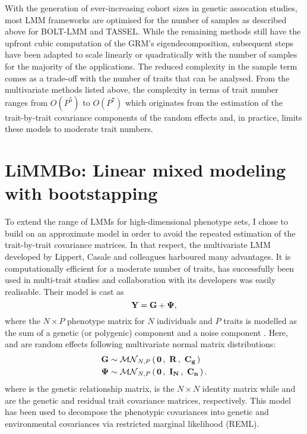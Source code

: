 With the generation of ever-increasing cohort sizes in genetic assocation studies, most LMM frameworks are optimised for the number of samples as described above for BOLT-LMM and TASSEL. While the remaining methods still have the upfront cubic computation of the GRM's eigendecomposition, subsequent steps have been adapted to scale linearly or quadratically with the number of samples for the majority of the applications. The reduced complexity in the sample term comes as a trade-off with the number of traits that can be analysed. From the multivariate methods listed above, the complexity in terms of trait number ranges from \(O(P^5)\) to \(O(P^7)\) which originates from the estimation of the trait-by-trait covariance components of the random effects and, in practice, limits these models to moderate trait numbers.

\section{LiMMBo: Linear mixed modeling with bootstapping}
\label{section:intro-limmbo}
To extend the range of LMMs for high-dimensional phenotype sets, I chose to build on an approximate model in order to avoid the repeated estimation of the trait-by-trait covariance matrices. In that respect, the multivariate LMM developed by Lippert, Casale and colleagues \citep{Lippert2014,Casale2015} harboured many advantages. It is computationally efficient for a moderate number of traits, has successfully  been used in multi-trait studies \citep{Cannavo2016,Schor2017} and collaboration with its developers was easily realisable. 
Their model is cast as
\begin{equation}
\boldsymbol{\mathbf{Y}} = \boldsymbol{\mathbf{G}} + \boldsymbol{\mathbf{\Psi}},
\label{eq:vd}
\end{equation}
%
where the \(N \times P\) phenotype matrix  for \(N\) individuals and \(P\) traits is modelled as the sum of a genetic (or polygenic) component  and a noise component \tmat{\Psi}. Here,  and  are random effects following multivariate normal matrix distributions:
\begin{equation}
\begin{aligned}
\boldsymbol{\mathbf{G}} &\sim\mathcal{MN}_{N,P}\left(\, \boldsymbol{\mathbf{{\boldsymbol{\mathbf{0}}}}} \,,~\boldsymbol{\mathbf{{\boldsymbol{\mathbf{R}}}}}\,,~\boldsymbol{\mathbf{{\boldsymbol{\mathbf{C}}_{g}}}} \,\right)  \\
\boldsymbol{\mathbf{\Psi}} &\sim\mathcal{MN}_{N,P}\left(\, \boldsymbol{\mathbf{{\boldsymbol{\mathbf{0}}}}} \,,~\boldsymbol{\mathbf{{\boldsymbol{\mathbf{I}}_N}}}\,,~\boldsymbol{\mathbf{{\boldsymbol{\mathbf{C}}_{n}}}} \,\right).
\end{aligned}
\end{equation}
%
where  is the genetic relationship matrix,  is the \(N \times N\) identity matrix while  and  are the genetic and residual trait covariance matrices, respectively. This model has been used to decompose the phenotypic covariances into genetic and environmental covariances via restricted marginal likelihood (REML). 

